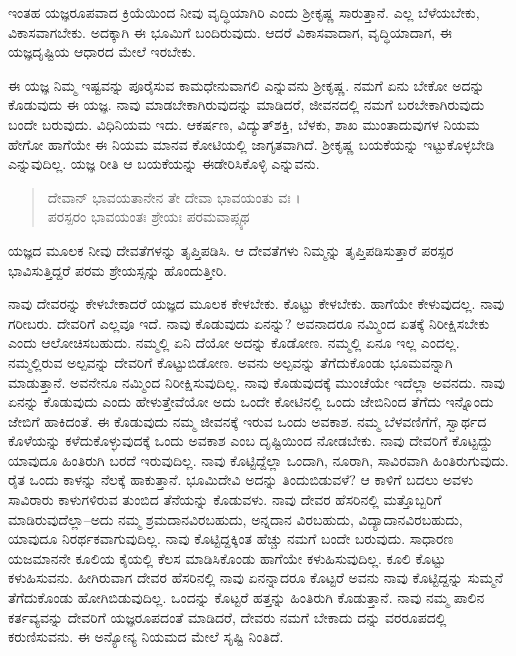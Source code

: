 ಇಂತಹ ಯಜ್ಞರೂಪವಾದ ಕ್ರಿಯೆಯಿಂದ ನೀವು ವೃದ್ಧಿಯಾಗಿರಿ ಎಂದು ಶ್ರೀಕೃಷ್ಣ ಸಾರುತ್ತಾನೆ. ಎಲ್ಲ ಬೆಳೆಯಬೇಕು, ವಿಕಾಸವಾಗಬೇಕು. ಅದಕ್ಕಾಗಿ ಈ ಭೂಮಿಗೆ ಬಂದಿರುವುದು. ಆದರೆ ವಿಕಾಸವಾದಾಗ, ವೃದ್ಧಿಯಾದಾಗ, ಈ ಯಜ್ಞದೃಷ್ಟಿಯ ಆಧಾರದ ಮೇಲೆ ಇರಬೇಕು.

ಈ ಯಜ್ಞ ನಿಮ್ಮ ಇಷ್ಟವನ್ನು ಪೂರೈಸುವ ಕಾಮಧೇನುವಾಗಲಿ ಎನ್ನುವನು ಶ್ರೀಕೃಷ್ಣ. ನಮಗೆ ಏನು ಬೇಕೋ ಅದನ್ನು ಕೊಡುವುದು ಈ ಯಜ್ಞ. ನಾವು ಮಾಡಬೇಕಾಗಿರುವುದನ್ನು ಮಾಡಿದರೆ, ಜೀವನದಲ್ಲಿ ನಮಗೆ ಬರಬೇಕಾಗಿರುವುದು ಬಂದೇ ಬರುವುದು. ವಿಧಿನಿಯಮ ಇದು. ಆಕರ್ಷಣ, ವಿದ್ಯುತ್​ಶಕ್ತಿ, ಬೆಳಕು, ಶಾಖ ಮುಂತಾದುವುಗಳ ನಿಯಮ ಹೇಗೋ ಹಾಗೆಯೇ ಈ ನಿಯಮ ಮಾನವ ಕೋಟಿಯಲ್ಲಿ ಜಾಗೃತವಾಗಿದೆ. ಶ್ರೀಕೃಷ್ಣ ಬಯಕೆಯನ್ನು ಇಟ್ಟುಕೊಳ್ಳಬೇಡಿ ಎನ್ನುವುದಿಲ್ಲ. ಯಜ್ಞ ರೀತಿ ಆ ಬಯಕೆಯನ್ನು ಈಡೇರಿಸಿಕೊಳ್ಳಿ ಎನ್ನುವನು.

\begin{verse}
ದೇವಾನ್ ಭಾವಯತಾನೇನ ತೇ ದೇವಾ ಭಾವಯಂತು ವಃ ।\\ಪರಸ್ಪರಂ ಭಾವಯಂತಃ ಶ್ರೇಯಃ ಪರಮವಾಪ್ಸ್ಯಥ 
\end{verse}

{\small ಯಜ್ಞದ ಮೂಲಕ ನೀವು ದೇವತೆಗಳನ್ನು ತೃಪ್ತಿಪಡಿಸಿ. ಆ ದೇವತೆಗಳು ನಿಮ್ಮನ್ನು ತೃಪ್ತಿಪಡಿಸುತ್ತಾರೆ ಪರಸ್ಪರ ಭಾವಿಸುತ್ತಿದ್ದರೆ ಪರಮ ಶ್ರೇಯಸ್ಸನ್ನು ಹೊಂದುತ್ತೀರಿ.}

ನಾವು ದೇವರನ್ನು ಕೇಳಬೇಕಾದರೆ ಯಜ್ಞದ ಮೂಲಕ ಕೇಳಬೇಕು. ಕೊಟ್ಟು ಕೇಳಬೇಕು. ಹಾಗೆಯೇ ಕೇಳುವುದಲ್ಲ. ನಾವು ಗರೀಬರು. ದೇವರಿಗೆ ಎಲ್ಲವೂ ಇದೆ. ನಾವು ಕೊಡುವುದು ಏನನ್ನು? ಅವನಾದರೂ ನಮ್ಮಿಂದ ಏತಕ್ಕೆ ನಿರೀಕ್ಷಿಸಬೇಕು ಎಂದು ಆಲೋಚಿಸಬಹುದು. ನಮ್ಮಲ್ಲಿ ಏನಿ ದೆಯೋ ಅದನ್ನು ಕೊಡೋಣ. ನಮ್ಮಲ್ಲಿ ಏನೂ ಇಲ್ಲ ಎಂದಲ್ಲ. ನಮ್ಮಲ್ಲಿರುವ ಅಲ್ಪವನ್ನು ದೇವರಿಗೆ ಕೊಟ್ಟುಬಿಡೋಣ. ಅವನು ಅಲ್ಪವನ್ನು ತೆಗೆದುಕೊಂಡು ಭೂಮವನ್ನಾಗಿ ಮಾಡುತ್ತಾನೆ. ಅವನೇನೂ ನಮ್ಮಿಂದ ನಿರೀಕ್ಷಿಸುವುದಿಲ್ಲ. ನಾವು ಕೊಡುವುದಕ್ಕೆ ಮುಂಚೆಯೇ ಇದೆಲ್ಲಾ ಅವನದು. ನಾವು ಏನನ್ನು ಕೊಡುವುದು ಎಂದು ಹೇಳುತ್ತೇವೆಯೋ ಅದು ಒಂದೇ ಕೋಟಿನಲ್ಲಿ ಒಂದು ಜೇಬಿನಿಂದ ತೆಗೆದು ಇನ್ನೊಂದು ಜೇಬಿಗೆ ಹಾಕಿದಂತೆ. ಈ ಕೊಡುವುದು ನಮ್ಮ ಜೀವನಕ್ಕೆ ಇರುವ ಒಂದು ಅವಕಾಶ. ನಮ್ಮ ಬೆಳವಣಿಗೆಗೆ, ಸ್ವಾರ್ಥದ ಕೊಳೆಯನ್ನು ಕಳೆದುಕೊಳ್ಳುವುದಕ್ಕೆ ಒಂದು ಅವಕಾಶ ಎಂಬ ದೃಷ್ಟಿಯಿಂದ ನೋಡಬೇಕು. ನಾವು ದೇವರಿಗೆ ಕೊಟ್ಟದ್ದು ಯಾವುದೂ ಹಿಂತಿರುಗಿ ಬರದೆ ಇರುವುದಿಲ್ಲ. ನಾವು ಕೊಟ್ಟಿದ್ದೆಲ್ಲಾ ಒಂದಾಗಿ, ನೂರಾಗಿ, ಸಾವಿರವಾಗಿ ಹಿಂತಿರುಗುವುದು. ರೈತ ಒಂದು ಕಾಳನ್ನು ನೆಲಕ್ಕೆ ಹಾಕುತ್ತಾನೆ. ಭೂಮಿದೇವಿ ಅದನ್ನು ತಿಂದುಬಿಡುವಳೆ? ಆ ಕಾಳಿಗೆ ಬದಲು ಅವಳು ಸಾವಿರಾರು ಕಾಳುಗಳಿರುವ ತುಂಬಿದ ತೆನೆಯನ್ನು ಕೊಡುವಳು. ನಾವು ದೇವರ ಹೆಸರಿನಲ್ಲಿ ಮತ್ತೊಬ್ಬರಿಗೆ ಮಾಡಿರುವುದೆಲ್ಲಾ–ಅದು ನಮ್ಮ ಶ್ರಮದಾನವಿರಬಹುದು, ಅನ್ನದಾನ ವಿರಬಹುದು, ವಿದ್ಯಾದಾನವಿರಬಹುದು, ಯಾವುದೂ ನಿರರ್ಥಕವಾಗುವುದಿಲ್ಲ. ನಾವು ಕೊಟ್ಟಿದ್ದಕ್ಕಿಂತ ಹೆಚ್ಚು ನಮಗೆ ಬಂದೇ ಬರುವುದು. ಸಾಧಾರಣ ಯಜಮಾನನೇ ಕೂಲಿಯ ಕೈಯಲ್ಲಿ ಕೆಲಸ ಮಾಡಿಸಿಕೊಂಡು ಹಾಗೆಯೇ ಕಳುಹಿಸುವುದಿಲ್ಲ. ಕೂಲಿ ಕೊಟ್ಟು ಕಳುಹಿಸುವನು. ಹೀಗಿರುವಾಗ ದೇವರ ಹೆಸರಿನಲ್ಲಿ ನಾವು ಏನನ್ನಾದರೂ ಕೊಟ್ಟರೆ ಅವನು ನಾವು ಕೊಟ್ಟಿದ್ದನ್ನು ಸುಮ್ಮನೆ ತೆಗೆದುಕೊಂಡು ಹೋಗಿಬಿಡುವುದಿಲ್ಲ. ಒಂದನ್ನು ಕೊಟ್ಟರೆ ಹತ್ತನ್ನು ಹಿಂತಿರುಗಿ ಕೊಡುತ್ತಾನೆ. ನಾವು ನಮ್ಮ ಪಾಲಿನ ಕರ್ತವ್ಯವನ್ನು ದೇವರಿಗೆ ಯಜ್ಞರೂಪದಂತೆ ಮಾಡಿದರೆ, ದೇವರು ನಮಗೆ ಬೇಕಾದು ದನ್ನು ವರರೂಪದಲ್ಲಿ ಕರುಣಿಸುವನು. ಈ ಅನ್ಯೋನ್ಯ ನಿಯಮದ ಮೇಲೆ ಸೃಷ್ಟಿ ನಿಂತಿದೆ.

